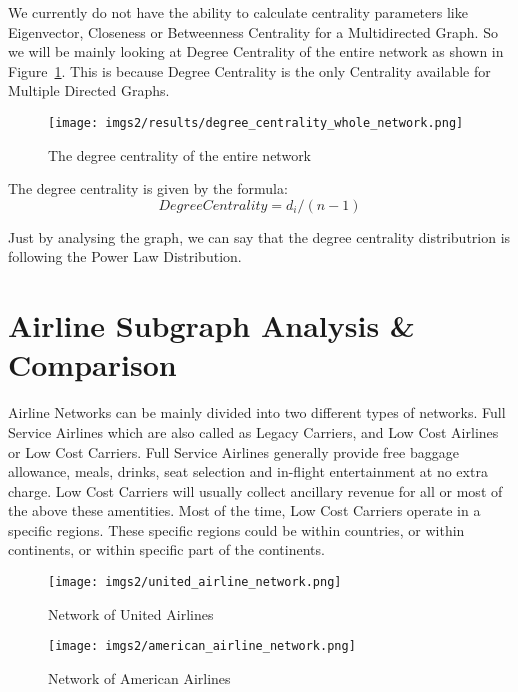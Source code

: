\documentclass[twocolumn]{tum-article}
\begin{document}
We currently do not have the ability to calculate centrality parameters like Eigenvector, Closeness or Betweenness Centrality for a Multidirected Graph. So we will be mainly looking at Degree Centrality of the entire network as shown in Figure~\ref{fig:degree_centrality}.
This is because Degree Centrality is the only Centrality available for Multiple Directed Graphs.

\begin{figure}
        \centering
        \texttt{[image: imgs2/results/degree\_centrality\_whole\_network.png]}
        \caption{
The degree centrality of the entire network}
        \label{fig:degree_centrality}
\end{figure}

The degree centrality is given by the formula:
\begin{equation}
	Degree Centrality=d_i/(n-1)
\end{equation}

Just by analysing the graph, we can say that the degree centrality distributrion is following the Power Law Distribution.

\section{Airline Subgraph Analysis \& Comparison}

Airline Networks can be mainly divided into two different types of networks. Full Service Airlines which are also called as Legacy Carriers, and Low Cost Airlines or Low Cost Carriers.  
Full Service Airlines generally provide free baggage allowance, meals, drinks, seat selection and in-flight entertainment at no extra charge.
Low Cost Carriers will usually collect ancillary revenue for all or most of the above these amentities.
Most of the time, Low Cost Carriers operate in a specific regions.
These specific regions could be within countries, or within continents, or within specific part of the continents.

\begin{figure}
        \centering
        \texttt{[image: imgs2/united\_airline\_network.png]}
        \caption{
Network of United Airlines}
        \label{fig:united_airline}
\end{figure}

\begin{figure}
        \centering
        \texttt{[image: imgs2/american\_airline\_network.png]}
        \caption{
Network of American Airlines}
        \label{fig:american_airline}
\end{figure}
\end{document}
